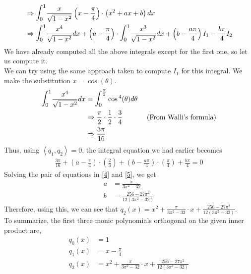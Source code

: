 \documentclass[letterpaper]{exam}
\begin{document}
\begin{questions}
\begin{parts}
\begin{solution}
\begin{align*}
   &\Rightarrow 
   \mathlarger{\mathlarger{\int}}_0^1 \frac{x}{\sqrt{1-x^2}} \left(x - \frac{\pi}{4}\right)\cdot\left(x^2 + ax + b\right) dx \\
   &\Rightarrow
   \mathlarger{\mathlarger{\int}}_0^1 \frac{x^4}{\sqrt{1-x^2}} dx + \left(a - \frac{\pi}{4}\right)\cdot \mathlarger{\mathlarger{\int}}_0^1 \frac{x^3}{\sqrt{1-x^2}} dx +
   \left(b - \frac{a\pi}{4}\right) I_1 - \frac{b\pi}{4} I_2
\end{align*}
We have already computed all the above integrals except for the first one, so let us compute it.\\
We can try using the same approach taken to compute $I_1$ for this integral. We make the substitution $x = \cos{(\theta)}$.  
\begin{align*}
 \mathlarger{\mathlarger{\int}}_0^1 \frac{x^4}{\sqrt{1-x^2}} dx &= \mathlarger{\mathlarger{\int}}_0^{\frac{\pi}{2}} \cos{^4(\theta)} d\theta \\
 &\Rightarrow
 \frac{\pi}{2}\cdot\frac{1}{2}\cdot \frac{3}{4} &\mbox{ (From Walli's formula)}\\
 &\Rightarrow
 \frac{3\pi}{16}
\end{align*}
Thus, using $\left< q_1,q_2 \right> = 0$, the integral equation we had earlier becomes
\begin{align}\label{5}
   \frac{3\pi}{16} + \left(a - \frac{\pi}{4}\right)\cdot\left(\frac{2}{3}\right) +  \left(b - \frac{a\pi}{4}\right)\cdot\left(\frac{\pi}{4}\right) + \frac{b\pi}{4} = 0
\end{align}
Solving the pair of equations in \ref{4} and \ref{5}, we get 
\begin{align*}
    a &= \frac{\pi}{3\pi^2 - 32}\\
    b &= \frac{256 - 27\pi^2}{12(3\pi^2 - 32)}
\end{align*}
Therefore, using this, we can see that $q_2(x) = x^2 + \frac{\pi}{3\pi^2 - 32}\cdot x + \frac{256 - 27\pi^2}{12(3\pi^2 - 32)}$.\\
To summarize, the first three monic polynomials orthogonal on the given inner product are,
\begin{align*}
    q_0(x) &= 1\\
    q_1(x) &= x - \frac{\pi}{4}\\
    q_2(x) &= x^2 + \frac{\pi}{3\pi^2 - 32}\cdot x + \frac{256 - 27\pi^2}{12(3\pi^2 - 32)}
\end{align*}
\end{solution}

\end{parts}
\end{questions}
\end{document}
